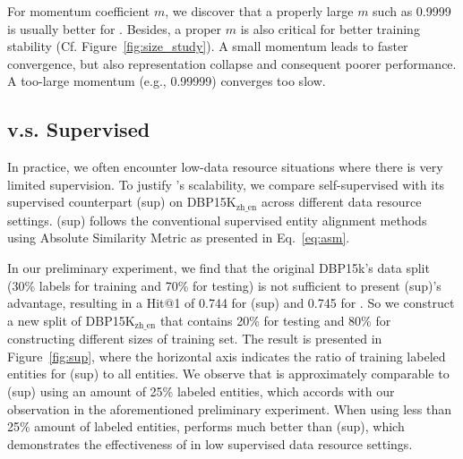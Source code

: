 For momentum coefficient $m$, we discover that a properly large $m$ such as 0.9999 is usually better for \solution. Besides, a proper $m$ is also critical for better training stability (Cf. Figure~\ref{fig:size_study}). A small momentum leads to faster convergence, but also representation collapse and consequent poorer performance. A too-large momentum (e.g., 0.99999) converges too slow.


% 

\subsection{\solution v.s. Supervised \solution}
In practice, we often encounter low-data resource situations where there is very limited supervision. To justify \solution's scalability, we compare self-supervised \solution with its supervised counterpart \solution(sup) on DBP15K$_{\text{zh\_en}}$ across different data resource settings. \solution(sup) follows the conventional supervised entity alignment methods using Absolute Similarity Metric as presented in Eq.~\ref{eq:asm}.

In our preliminary experiment, we find that the original DBP15k's data split (30\% labels for training and 70\% for testing) is not sufficient to present \solution(sup)'s advantage, resulting in a Hit@1 of 0.744 for \solution(sup) and 0.745 for \solution.
So we construct a new split of DBP15K$_{\text{zh\_en}}$ that contains 20\% for testing and 80\% for constructing different sizes of training set. The result is presented in Figure~\ref{fig:sup}, where the horizontal axis indicates the ratio of training labeled entities for \solution(sup) to all entities. We observe that \solution is approximately comparable to \solution(sup) using an amount of 25\% labeled entities, which accords with our observation in the aforementioned preliminary experiment. When using less than 25\% amount of labeled entities, \solution performs much better than \solution(sup), which demonstrates the effectiveness of \solution in low supervised data resource settings.





